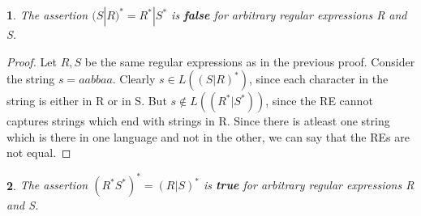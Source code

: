 \documentclass[11pt]{article}
\newtheorem{theorem}{}
\begin{document}
\begin{theorem}
	The assertion $(S|R)^* = R^* | S^*$ is \textbf{false} for arbitrary regular expressions R and S.
\end{theorem}
\begin{proof}
	Let $R,S$ be the same regular expressions as in the previous proof. Consider the string
	$s = aabbaa$. Clearly $s \in L( (S|R)^* )$, since each character in the string is either
	in R or in S. But $s \notin L( (R^* | S^*) )$, since the RE cannot captures strings which
	end with strings in R. Since there is atleast one string which is there in one language
	and not in the other, we can say that the REs are not equal.
\end{proof}

\begin{theorem}
	The assertion $( R^* S^* )^* = ( R | S )^* $ is \textbf{true} for arbitrary regular expressions R and S.
\end{theorem}
\end{document}
